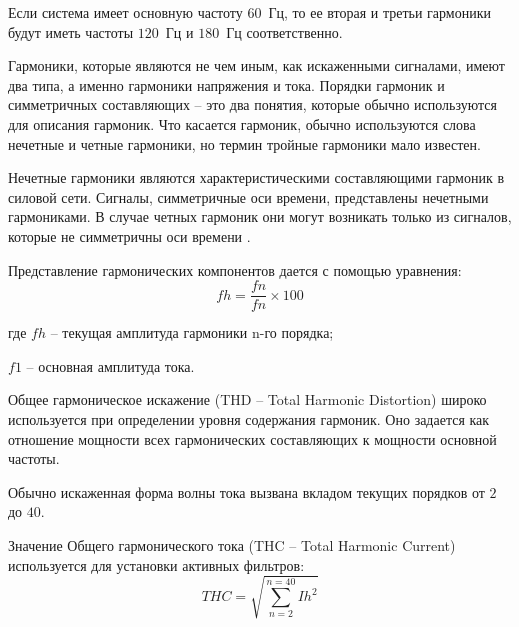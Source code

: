 Если система имеет основную частоту $60$~Гц, то ее вторая и третьи гармоники будут иметь частоты $120$~Гц и $180$~Гц соответственно.


Гармоники, которые являются не чем иным, как искаженными сигналами, имеют два типа, а именно гармоники напряжения и тока. Порядки гармоник и симметричных составляющих – это два понятия, которые обычно используются для описания гармоник. Что касается гармоник, обычно используются слова нечетные и четные гармоники, но термин тройные гармоники мало известен.

Нечетные гармоники являются характеристическими составляющими гармоник в силовой сети. Сигналы, симметричные оси времени, представлены нечетными гармониками. В случае четных гармоник они могут возникать только из сигналов, которые не симметричны оси времени \cite{soni2014review}.
 
Представление гармонических компонентов дается с помощью уравнения:  
\begin{equation}
	\label{eq:equation1.12}
	fh = \frac{fn}{fn}\times 100
\end{equation} 

где $fh$ – текущая амплитуда гармоники n-го порядка;

$f1$ – основная амплитуда тока.

Общее гармоническое искажение (THD – Total Harmonic Distortion) широко используется при определении уровня содержания гармоник. Оно задается как отношение мощности всех гармонических составляющих к мощности основной частоты.

Обычно искаженная форма волны тока вызвана вкладом текущих порядков от $2$ до $40$. 

Значение Общего гармонического тока (THC – Total Harmonic Current) используется для установки активных фильтров:
\begin{equation}
	\label{eq:equation1.13}
	THC = \sqrt{\displaystyle\sum_{n=2}^{n=40} Ih^2}
\end{equation} 

